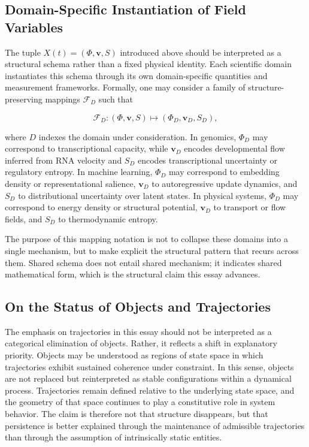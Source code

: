 \documentclass[12pt,a4paper]{article}
\begin{document}
\subsection{Domain-Specific Instantiation of Field Variables}

The tuple $X(t) = (\Phi, \mathbf{v}, S)$ introduced above should be interpreted
as a structural schema rather than a fixed physical identity. Each scientific domain
instantiates this schema through its own domain-specific quantities and measurement
frameworks. Formally, one may consider a family of structure-preserving mappings
$\mathcal{F}_D$ such that

\[
\mathcal{F}_D : (\Phi, \mathbf{v}, S) \mapsto (\Phi_D, \mathbf{v}_D, S_D),
\]

where $D$ indexes the domain under consideration. In genomics, $\Phi_D$ may
correspond to transcriptional capacity, while $\mathbf{v}_D$ encodes developmental
flow inferred from RNA velocity and $S_D$ encodes transcriptional uncertainty or
regulatory entropy. In machine learning, $\Phi_D$ may correspond to embedding
density or representational salience, $\mathbf{v}_D$ to autoregressive update
dynamics, and $S_D$ to distributional uncertainty over latent states. In physical
systems, $\Phi_D$ may correspond to energy density or structural potential,
$\mathbf{v}_D$ to transport or flow fields, and $S_D$ to thermodynamic entropy.

The purpose of this mapping notation is not to collapse these domains into a single
mechanism, but to make explicit the structural pattern that recurs across them.
Shared schema does not entail shared mechanism; it indicates shared mathematical
form, which is the structural claim this essay advances.

\subsection{On the Status of Objects and Trajectories}

The emphasis on trajectories in this essay should not be interpreted as a categorical
elimination of objects. Rather, it reflects a shift in explanatory priority. Objects
may be understood as regions of state space in which trajectories exhibit sustained
coherence under constraint. In this sense, objects are not replaced but reinterpreted
as stable configurations within a dynamical process. Trajectories remain defined
relative to the underlying state space, and the geometry of that space continues to
play a constitutive role in system behavior. The claim is therefore not that structure
disappears, but that persistence is better explained through the maintenance of
admissible trajectories than through the assumption of intrinsically static entities.
\end{document}
